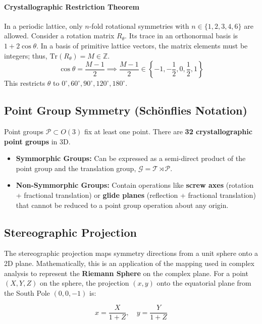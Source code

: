 \documentclass[10pt, a4paper]{article}
\begin{document}
\paragraph{Crystallographic Restriction Theorem}
In a periodic lattice, only $n$-fold rotational symmetries with $n \in \{1, 2, 3, 4, 6\}$ are allowed.
Consider a rotation matrix $R_\theta$. Its trace in an orthonormal basis is $1 + 2\cos\theta$. In a basis of primitive lattice vectors, the matrix elements must be integers; thus, $\text{Tr}(R_\theta) = M \in \mathbb{Z}$.
\begin{equation}
    \cos\theta = \frac{M-1}{2} \implies \frac{M-1}{2} \in \left\{ -1, -\frac{1}{2}, 0, \frac{1}{2}, 1 \right\}
\end{equation}
This restricts $\theta$ to $0^\circ, 60^\circ, 90^\circ, 120^\circ, 180^\circ$.

\subsection{Point Group Symmetry (Schönflies Notation)}
Point groups $\mathcal{P} \subset O(3)$ fix at least one point. There are \textbf{32 crystallographic point groups} in 3D.
\begin{itemize}
    \item \textbf{Symmorphic Groups:} Can be expressed as a semi-direct product of the point group and the translation group, $\mathcal{G} = \mathcal{T} \rtimes \mathcal{P}$.
    \item \textbf{Non-Symmorphic Groups:} Contain operations like \textbf{screw axes} (rotation + fractional translation) or \textbf{glide planes} (reflection + fractional translation) that cannot be reduced to a point group operation about any origin.
\end{itemize}

\subsection{Stereographic Projection}
The stereographic projection maps symmetry directions from a unit sphere onto a 2D plane. Mathematically, this is an application of the mapping used in complex analysis to represent the \textbf{Riemann Sphere} on the complex plane. For a point $(X, Y, Z)$ on the sphere, the projection $(x, y)$ onto the equatorial plane from the South Pole $(0,0,-1)$ is:

\begin{equation}
    x = \frac{X}{1+Z}, \quad y = \frac{Y}{1+Z}
\end{equation}
\end{document}

